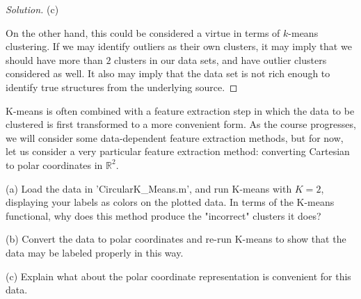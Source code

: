\documentclass[10pt]{article}
\newenvironment{problem}[2][]{\begin{trivlist}
\item[\hskip \labelsep {\bfseries #1}\hskip \labelsep {\bfseries #2.}]}{\end{trivlist}}
\begin{document}
\begin{proof}[Solution]
(c)

On the other hand, this could be considered a virtue in terms of $k$-means clustering. If we may identify outliers as their own clusters, it may imply that we should have more than $2$ clusters in our data sets, and have outlier clusters considered as well. It also may imply that the data set is not rich enough to identify true structures from the underlying source.


\end{proof}

\begin{problem}{Question 3}

K-means is often combined with a feature extraction step in which the data to be clustered is first transformed to a more convenient form. As the course progresses, we will consider some data-dependent feature extraction methods, but for now, let us consider a very particular feature extraction method: converting Cartesian to polar coordinates in $\mathbb{R}^2$.

(a) Load the data in 'CircularK\_Means.m', and run K-means with $K=2$, displaying your labels as colors on the plotted data. In terms of the K-means functional, why does this method produce the "incorrect" clusters it does?

(b) Convert the data to polar coordinates and re-run K-means to show that the data may be labeled properly in this way.

(c) Explain what about the polar coordinate representation is convenient for this data.

\end{problem}
\end{document}
